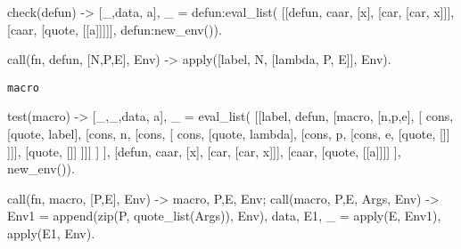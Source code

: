 \documentclass[preview,multi,crop=false,border=1in,class=memoir]{standalone}
\begin{document}
\begin{preview-page}
\begin{Exercise}[title={defun},difficulty=1]
\begin{SourceCode}
check(defun) ->
    {[_,{data, a}], _} =
        defun:eval_list(
          [[defun, caar, [x], [car, [car, x]]],
           [caar, [quote, [[a]]]]], defun:new_env()).
\end{SourceCode}

\end{Exercise}

\begin{Answer}

\begin{SourceCode}
call({fn, defun}, [N,P,E], Env) ->
    apply([label, N, [lambda, P, E]], Env).
\end{SourceCode}
\end{Answer}

\verb|macro|

\begin{SourceCode}
test(macro) ->
    {[_,_,{data, a}], _} =
        eval_list(
          [[label, defun,
            [macro, [n,p,e],
             [ cons, [quote, label],
              [cons, n,
              [cons, [ cons, [quote, lambda],
                      [cons, p,
                      [cons, e,
                             [quote, []]
                      ]]],
                     [quote, []]
              ]]]
            ]
           ],
           [defun, caar, [x], [car, [car, x]]],
           [caar, [quote, [[a]]]]
          ], new_env()).
\end{SourceCode}

\begin{SourceCode}
call({fn, macro}, [P,E], Env) ->
    {{macro, {P,E}}, Env};
call({macro, {P,E}}, Args, Env) ->
    Env1 = append(zip(P, quote_list(Args)), Env),
    {{data, E1}, _} = apply(E, Env1),
    apply(E1, Env).
\end{SourceCode}


\end{preview-page}
\end{document}
